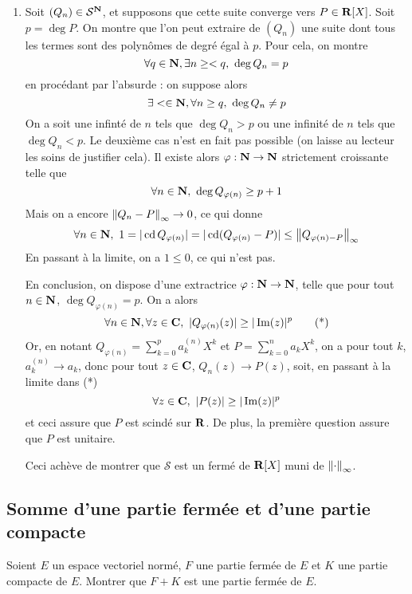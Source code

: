 \begin{correction}
\begin{enumerate}
        \item Soit $(Q_n)\in\mathcal S^{\operatorname{\mathbf{N}}}$, et supposons que cette suite converge vers $P\in\operatorname{\mathbf{R}}[X]$.
        Soit $p=\deg P$. 
        On montre que l'on peut extraire de $(Q_n)$ une suite dont tous les termes sont des polynômes de degré égal à $p$.
        Pour cela, on montre 
        \[
            \forall q\in\operatorname{\mathbf{N}}, \exists n\geq < q,\ \deg Q_n=p    
        \]
        en procédant par l'absurde : on suppose alors 
        \[
            \exists <\in\operatorname{\mathbf{N}}, \forall n\geq q,\ \deg Q_n\neq p
        \]
        On a soit une infinté de $n$ tels que $\deg Q_n > p$ ou une infinité de $n$ tels que $\deg Q_n < p$. 
        Le deuxième cas n'est en fait pas possible (on laisse au lecteur les soins de justifier cela). 
        Il existe alors $\varphi : \operatorname{\mathbf{N}}\to\operatorname{\mathbf{N}}$ strictement croissante telle que 
        \[
            \forall n\in\operatorname{\mathbf{N}},\ \deg Q_{\varphi(n)}\geq p + 1
        \]
        Mais on a encore $\left\lVert Q_n-P\right\rVert_\infty\to 0$, ce qui donne 
        \[
            \forall n\in\operatorname{\mathbf{N}},\ 1=|\operatorname{cd} Q_{\varphi(n)}|=|\operatorname{cd}(Q_{\varphi(n)}-P)|\leq \left\lVert Q_{\varphi(n)-P}\right\rVert_\infty
        \]
        En passant à la limite, on a $1\leq 0$, ce qui n'est pas. 

        En conclusion, on dispose d'une extractrice $\varphi:\operatorname{\mathbf{N}}\to\operatorname{\mathbf{N}}$, telle que pour tout $n\in\operatorname{\mathbf{N}}$, $\deg Q_{\varphi(n)}=p$.
        On a alors 
        \[
            \forall n\in\N,\forall z\in\C,\ |Q_{\varphi(n)}(z)|\geq|\Im(z)|^p    \tag*{(*)}
        \]
        Or, en notant $Q_{\varphi(n)}=\sum_{k=0}^pa_k^{(n)}X^k$ et $P=\sum_{k=0}^na_kX^k$, on a pour tout $k$, $a_k^{(n)}\to a_k$, donc pour tout $z\in\operatorname{\mathbf{C}}$, $Q_n(z)\to P(z)$,
        soit, en passant à la limite dans (*)
        \[
            \forall z\in\operatorname{\mathbf{C}},\ |P(z)|\geq|\operatorname{Im}(z)|^p
        \]
        et ceci assure que $P$ est scindé sur $\operatorname{\mathbf{R}}$. 
        De plus, la première question assure que $P$ est unitaire.
        
        Ceci achève de montrer que $\mathcal S$ est un fermé de $\operatorname{\mathbf{R}}[X]$ muni de $\left\lVert \cdot\right\rVert_\infty$.
    \end{enumerate}
\end{correction}


\subsection{Somme d'une partie fermée et d'une partie compacte}
\begin{exercice}
	Soient $E$ un espace vectoriel normé, $F$ une partie fermée de $E$ et $K$ une partie compacte de $E$. Montrer que $F+K$ est une partie fermée de $E$.
\end{exercice}

